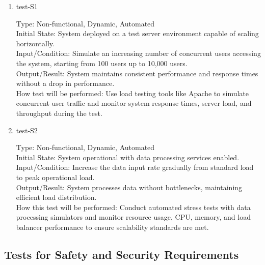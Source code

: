 \documentclass[12pt, titlepage]{article}
\begin{document}
\begin{enumerate}

    \item{test-S1\\} \label{test-S1}
    
    Type: Non-functional, Dynamic, Automated\\
    
    Initial State: System deployed on a test server environment capable of scaling horizontally.\\
    
    Input/Condition: Simulate an increasing number of concurrent users accessing the system, starting from 100 users up to 10,000 users.\\
    
    Output/Result: System maintains consistent performance and response times without a drop in performance.\\
    
    How test will be performed: Use load testing tools like Apache to simulate concurrent user traffic and monitor system response times, server load, and throughput during the test.
    
    \item{test-S2\\} \label{test-S2}
    
    Type: Non-functional, Dynamic, Automated\\
    
    Initial State: System operational with data processing services enabled.\\
    
    Input/Condition: Increase the data input rate gradually from standard load to peak operational load.\\
    
    Output/Result: System processes data without bottlenecks, maintaining efficient load distribution.\\
    
    How this test will be performed: Conduct automated stress tests with data processing simulators and monitor resource usage, CPU, memory, and load balancer performance to ensure scalability standards are met.
    
\end{enumerate}


\subsection{Tests for Safety and Security Requirements} \label{section:4.3}
\end{document}
